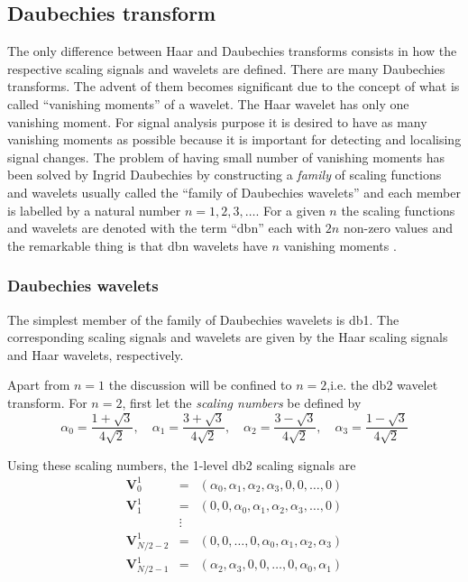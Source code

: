 \documentclass[a4paper,11pt]{report}
\begin{document}
\subsection{Daubechies transform}
The only difference between Haar and Daubechies transforms consists in how the respective scaling signals and wavelets are defined. There are many Daubechies transforms. The advent of them becomes significant due to the concept of what is called ``vanishing moments'' of a wavelet.
The Haar wavelet has only one vanishing moment. For signal analysis purpose it is desired to have as many vanishing moments as possible because it is important for detecting and localising signal changes. The problem of having small number of vanishing moments has been solved by Ingrid Daubechies by constructing a \emph{family} of scaling functions and wavelets usually called the ``family of Daubechies wavelets'' and each member is labelled by a natural number $n=1,2,3,\ldots$. For a given $n$ the scaling functions and wavelets are denoted with the term ``dbn'' each with $2n$ non-zero values and the remarkable thing is that dbn wavelets have $n$ vanishing moments \cite{stark}.

\subsubsection{Daubechies wavelets}
The simplest member of the family of Daubechies wavelets is db1. The corresponding scaling signals and wavelets are given by the Haar scaling signals and Haar wavelets, respectively.

Apart from $n=1$ the discussion will be confined to $n=2$,i.e. the db2 wavelet transform. For $n=2$, first let the \emph{scaling numbers} be defined by
\begin{equation}
\alpha_{0}=\frac{1+\sqrt{3}}{4\sqrt{2}}, \quad \alpha_{1}=\frac{3+\sqrt{3}}{4\sqrt{2}}, \quad \alpha_{2}=\frac{3-\sqrt{3}}{4\sqrt{2}}, \quad \alpha_{3}=\frac{1-\sqrt{3}}{4\sqrt{2}}
\end{equation}

Using these scaling numbers, the 1-level db2 scaling signals are
\begin{eqnarray}
\mathbf{V}_{0}^{1} & = & ( \alpha_{0},\alpha_{1},\alpha_{2},\alpha_{3},0,0,\ldots,0 ) \nonumber \\
\mathbf{V}_{1}^{1} & = & ( 0,0,\alpha_{0},\alpha_{1},\alpha_{2},\alpha_{3},\ldots,0 ) \nonumber \\
	 & \vdots & 	\nonumber \\
\mathbf{V}_{N/2-2}^{1} & = & ( 0,0,\ldots,0,\alpha_{0},\alpha_{1},\alpha_{2},\alpha_{3} ) \nonumber \\ 
\mathbf{V}_{N/2-1}^{1} & = & ( \alpha_{2},\alpha_{3},0,0,\ldots,0,\alpha_{0},\alpha_{1} )  
\end{eqnarray}
\end{document}
